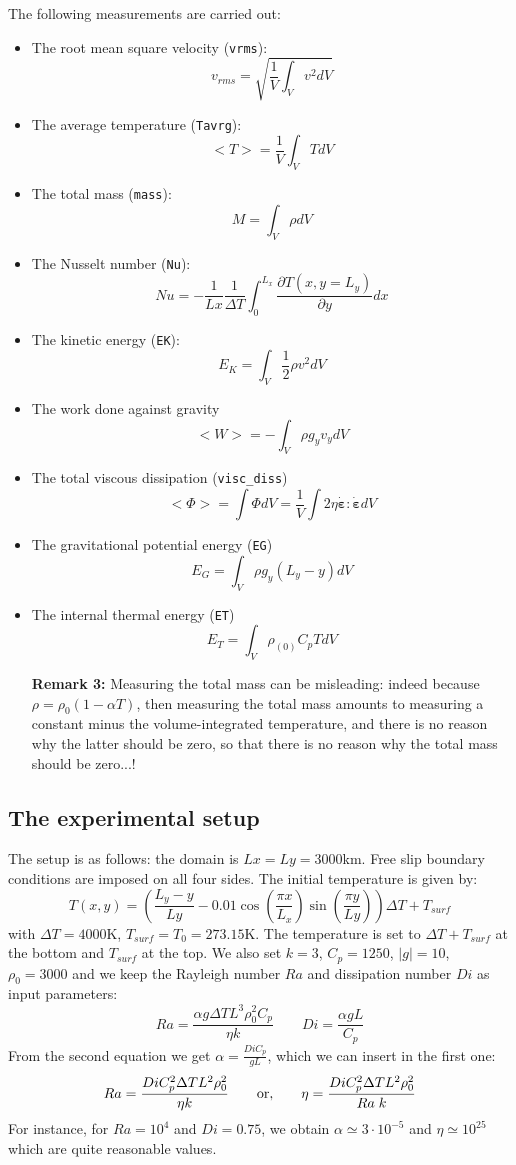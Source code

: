 The following measurements are carried out:
\begin{itemize}
\item The root mean square velocity ({\tt vrms}):
\[
v_{rms} = \sqrt{\frac{1}{V}\int_V v^2 dV   }
\]
\item The average temperature ({\tt Tavrg}):
\[
<T>=\frac{1}{V}\int_V T dV
\]
\item The total mass ({\tt mass}):
\[
M=\int_V \rho dV 
\]
\item The Nusselt number ({\tt Nu}):
\[
Nu=-\frac{1}{Lx}\frac{1}{\Delta T} \int_0^{L_x} \frac{\partial T(x,y=L_y)}{\partial y} dx
\]
\item The kinetic energy ({\tt EK}):
\[
E_K=\int_V \frac{1}{2}\rho v^2 dV
\]
\item The work done against gravity 
\[
<W>=-\int_V \rho g_y v_y dV
\]
\item The total viscous dissipation ({\tt visc\_diss})
\[
<\Phi>=\int \Phi dV =\frac{1}{V}\int 2 \eta \dot{\bm \varepsilon}:\dot{\bm \varepsilon} dV 
\]
\item The gravitational potential energy ({\tt EG})
\[
E_G = \int_V \rho g_y (L_y-y) dV
\]
\item The internal thermal energy ({\tt ET})
\[
E_T = \int_V \rho_{(0)} C_p T dV
\]

{\bf Remark 3:} Measuring the total mass can be misleading: indeed because $\rho=\rho_0(1-\alpha T)$, then 
measuring the total mass amounts to measuring a constant minus the volume-integrated temperature, and there is 
no reason why the latter should be zero, so that there is no reason why the total mass should be zero...!

\end{itemize}




\subsection*{The experimental setup}

The setup is as follows: the domain is $Lx=Ly=3000$km. Free slip boundary conditions are imposed on all four sides. 
The initial temperature is given by:
\[
T(x,y) = \left(  \frac{L_y-y}{Ly} - 0.01\cos(\frac{\pi x}{L_x}) \sin(\frac{\pi y}{Ly}) \right) \Delta T + T_{surf}
\]
with $\Delta T=4000$K, $T_{surf}=T_0=273.15$K. The temperature is set to $\Delta T + T_{surf}$ at the bottom and $T_{surf}$ at the top.
We also set $k=3$, $C_p=1250$, $|g|=10$, $\rho_0=3000$ and we keep the Rayleigh number $Ra$ and dissipation number $Di$ as input parameters:
\[
Ra=\frac{\alpha g \Delta T L^3 \rho_0^2 C_p}{\eta k}
\quad\quad
Di=\frac{\alpha g L}{C_p}
\]
From the second equation we get $\alpha=\frac{Di C_p}{g L}$, which we can insert in the first one:
\[
Ra=\frac{Di C_p^2 \Delta T L^2 \rho_0^2 }{\eta k}
\quad\quad
{\rm or,}
\quad\quad
\eta=
\frac{Di C_p^2 \Delta T L^2 \rho_0^2 }{Ra \; k  }
\]
For instance, for $Ra=10^4$ and $Di=0.75$, we obtain $\alpha\simeq 3\cdot 10^{-5}$ and $\eta\simeq 10^{25}$ 
which are quite reasonable values. 


